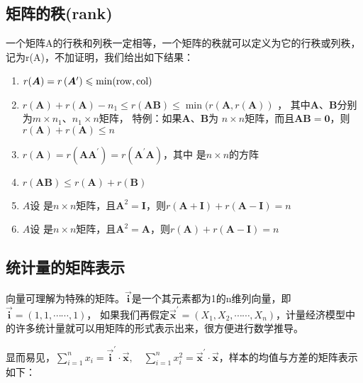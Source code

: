 	\subsection{矩阵的秩(rank)}

  一个矩阵A的行秩和列秩一定相等，一个矩阵的秩就可以定义为它的行秩或列秩，记为r(A)，不加证明，我们给出如下结果：
  \begin{enumerate}[ 1) ]
 	\item $  r(\boldsymbol{A}) = r\left( \boldsymbol{A}^{\prime}\right) \leqslant \min( \rm row,col) $
	\item $  r(\boldsymbol{A})+r(\boldsymbol{A})-n_{1} \leqslant r(\boldsymbol{A B}) \leqslant \min (r(\boldsymbol{A}, r(\boldsymbol{A})) $ ，
	  其中$\boldsymbol{A}$、$\boldsymbol{B}$分别为$m \times n_1$、$n_{1} \times n$矩阵，
	  特例：如果$\boldsymbol{A}$、$\boldsymbol{B}$为 $n \times n$矩阵，而且$ \boldsymbol{AB=0}$，则 $ r(\boldsymbol{A})+r(\boldsymbol{A}) \le n $
 	\item $ r(\boldsymbol{A})=r\left(\boldsymbol{A} \boldsymbol{A}^{\prime}\right)=r\left(\boldsymbol{A}^{\prime} \boldsymbol{A}\right) $，其中 是$n \times n$的方阵
 	\item $ r(\boldsymbol{AB}) \le r(\boldsymbol{A})+r(\boldsymbol{B}) $
 	\item $ A $设 是$n \times n$矩阵，且$ \boldsymbol{A}^2 = \boldsymbol{I} $，则$ r(\boldsymbol{A+I})+r(\boldsymbol{A-I})=n $
 	\item $ A $设 是$n \times n$矩阵，且$ \boldsymbol{A}^2 = \boldsymbol{A} $，则$ r(\boldsymbol{A})+r(\boldsymbol{A-I})=n $
  \end{enumerate}

\subsection{统计量的矩阵表示}

向量可理解为特殊的矩阵。$ \vec{\boldsymbol{i}} $是一个其元素都为1的n维列向量，即$ \vec{\boldsymbol{i}} = (1,1,\cdots \cdots,1)$，
如果我们再假定$ \vec{\boldsymbol{x}} ^{\prime} = (X_1,X_2,\cdots \cdots,X_n) $，计量经济模型中的许多统计量就可以用矩阵的形式表示出来，很方便进行数学推导。

显而易见，$ \sum_{i=1}^{n} x_{i}=\vec{\boldsymbol{i}}^{\prime} \cdot \vec{\boldsymbol{x}}, \quad 
            \sum_{i=1}^{n} x_{i}^{2}=\vec{\boldsymbol{x}}^{\prime} \cdot \vec{\boldsymbol{x}} $，样本的均值与方差的矩阵表示如下：

